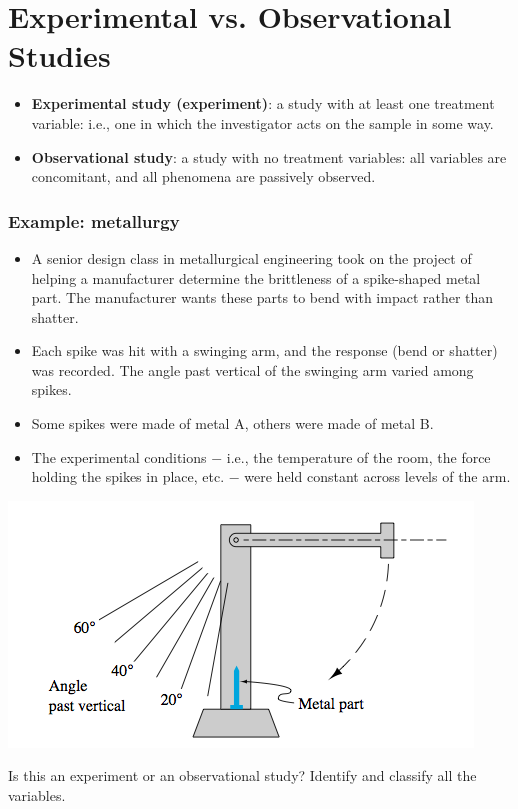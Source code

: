 \documentclass[handout]{beamer}
\numberwithin{equation}{section}
\begin{document}
\section{Experimental vs. Observational Studies}

\begin{frame}
\begin{itemize}
\item {\bf Experimental study (experiment)}: a study with at least one treatment variable: i.e., one in which the investigator acts on the sample in some way.
\pause \item {\bf Observational study}: a study with no treatment variables: all variables are concomitant, and all phenomena are passively observed.
\end{itemize}
\end{frame}

\begin{frame}
\frametitle{Example: metallurgy} \scriptsize

\begin{itemize}
\item A senior design class in metallurgical engineering took on the project of helping a manufacturer determine the brittleness of a spike-shaped metal part. The manufacturer wants these parts to bend with impact rather than shatter. 
\pause \item Each spike was hit with a swinging arm, and the response (bend or shatter) was recorded. The angle past vertical of the swinging arm varied among spikes. 
\pause \item Some spikes were made of metal A, others were made of metal B.
\pause \item The experimental conditions $-$ i.e., the temperature of the room, the force holding the spikes in place, etc. $-$ were held constant across levels of the arm.
\end{itemize}

 

\begin{center}
 \includegraphics{../../fig/brittleschematic.png}
\end{center}

\pause Is this an experiment or an observational study? Identify and classify all the variables.

\end{frame}
\end{document}
